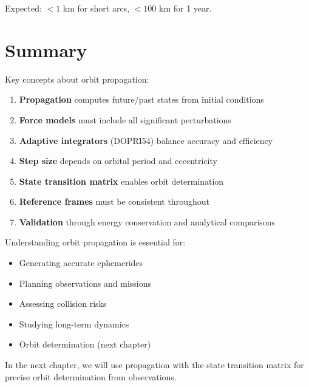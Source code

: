 Expected: $< 1$ km for short arcs, $< 100$ km for 1 year.

\section{Summary}

Key concepts about orbit propagation:

\begin{enumerate}
    \item \textbf{Propagation} computes future/past states from initial conditions
    \item \textbf{Force models} must include all significant perturbations
    \item \textbf{Adaptive integrators} (DOPRI54) balance accuracy and efficiency
    \item \textbf{Step size} depends on orbital period and eccentricity
    \item \textbf{State transition matrix} enables orbit determination
    \item \textbf{Reference frames} must be consistent throughout
    \item \textbf{Validation} through energy conservation and analytical comparisons
\end{enumerate}

Understanding orbit propagation is essential for:
\begin{itemize}
    \item Generating accurate ephemerides
    \item Planning observations and missions
    \item Assessing collision risks
    \item Studying long-term dynamics
    \item Orbit determination (next chapter)
\end{itemize}

In the next chapter, we will use propagation with the state transition matrix for precise orbit determination from observations.
